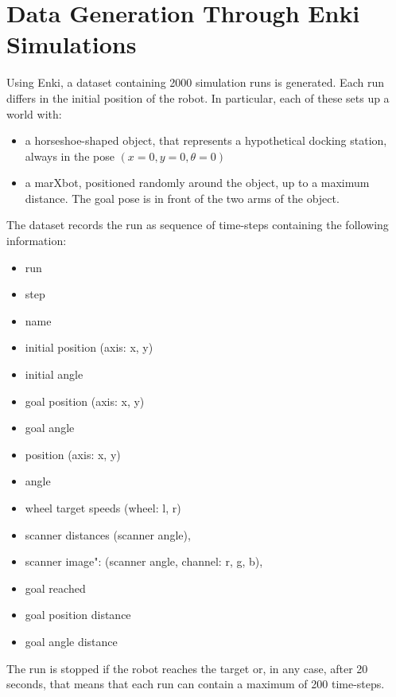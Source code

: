 \section{Data Generation Through Enki Simulations}
Using Enki, a dataset containing 2000 simulation runs is generated. Each run differs in the initial position of the 
robot. In particular, each of these sets up a world with:
\begin{itemize}
	\item a horseshoe-shaped object, that represents a hypothetical docking station, always in the pose $(x=0, y=0, 
	\theta=0)$
	\item a marXbot, positioned randomly around the object, up to a maximum distance. The goal pose is in front of the 
	two arms of the object.
\end{itemize}

The dataset records the run as sequence of time-steps containing the following information: 
\begin{itemize}
	\item run
	\item step
	\item name
	\item initial position (axis: x, y) 
	\item initial angle
	\item goal position (axis: x, y)
	\item goal angle
	\item position (axis: x, y) 
	\item angle
	\item wheel target speeds (wheel: l, r)
	\item scanner distances (scanner angle), 
	\item scanner image": (scanner angle, channel: r, g, b), 
	\item goal reached 
	\item goal position distance
	\item goal angle distance
\end{itemize}
The run is stopped if the robot reaches the target or, in any case, after 20 seconds, that means that each run can 
contain a maximum of 200 time-steps.

